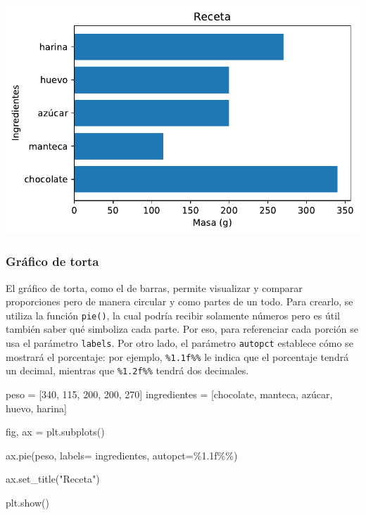 \documentclass[
  letterpaper,
  DIV=11,
  numbers=noendperiod]{scrreprt}
\newenvironment{Shaded}{\begin{snugshade}}{\end{snugshade}}
\newcommand{\DecValTok}[1]{\textcolor[rgb]{0.68,0.00,0.00}{#1}}
\newcommand{\NormalTok}[1]{\textcolor[rgb]{0.00,0.23,0.31}{#1}}
\newcommand{\OperatorTok}[1]{\textcolor[rgb]{0.37,0.37,0.37}{#1}}
\newcommand{\SpecialCharTok}[1]{\textcolor[rgb]{0.37,0.37,0.37}{#1}}
\newcommand{\StringTok}[1]{\textcolor[rgb]{0.13,0.47,0.30}{#1}}
\begin{document}
\includegraphics{unidad_6_files/figure-pdf/cell-120-output-1.pdf}

\subsubsection{Gráfico de torta}\label{gruxe1fico-de-torta}

El gráfico de torta, como el de barras, permite visualizar y comparar
proporciones pero de manera circular y como partes de un todo. Para
crearlo, se utiliza la función \texttt{pie()}, la cual podría recibir
solamente números pero es útil también saber qué simboliza cada parte.
Por eso, para referenciar cada porción se usa el parámetro
\texttt{labels}. Por otro lado, el parámetro \texttt{autopct} establece
cómo se mostrará el porcentaje: por ejemplo, \texttt{\%1.1f\%\%} le
indica que el porcentaje tendrá un decimal, mientras que
\texttt{\%1.2f\%\%} tendrá dos decimales.

\begin{Shaded}
\begin{Highlighting}[]
\NormalTok{peso }\OperatorTok{=}\NormalTok{ [}\DecValTok{340}\NormalTok{, }\DecValTok{115}\NormalTok{, }\DecValTok{200}\NormalTok{, }\DecValTok{200}\NormalTok{, }\DecValTok{270}\NormalTok{]}
\NormalTok{ingredientes }\OperatorTok{=}\NormalTok{ [}\StringTok{\textquotesingle{}chocolate\textquotesingle{}}\NormalTok{, }\StringTok{\textquotesingle{}manteca\textquotesingle{}}\NormalTok{, }\StringTok{\textquotesingle{}azúcar\textquotesingle{}}\NormalTok{, }\StringTok{\textquotesingle{}huevo\textquotesingle{}}\NormalTok{, }\StringTok{\textquotesingle{}harina\textquotesingle{}}\NormalTok{]}

\NormalTok{fig, ax }\OperatorTok{=}\NormalTok{ plt.subplots()}

\NormalTok{ax.pie(peso, labels}\OperatorTok{=}\NormalTok{ ingredientes, autopct}\OperatorTok{=}\StringTok{\textquotesingle{}}\SpecialCharTok{\%1.1f\%\%}\StringTok{\textquotesingle{}}\NormalTok{)}

\NormalTok{ax.set\_title(}\StringTok{"Receta"}\NormalTok{)}

\NormalTok{plt.show()}
\end{Highlighting}
\end{Shaded}
\end{document}

